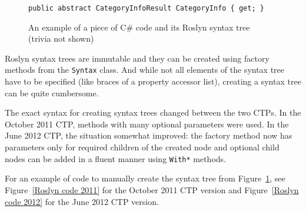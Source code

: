 \begin{figure}[htbp]

\begin{lstlisting}
public abstract CategoryInfoResult CategoryInfo { get; }
\end{lstlisting}

\begin{center}
\end{center}

\caption{An example of a piece of C\# code and its Roslyn syntax tree \\ (trivia not shown)}
\label{Syntax tree}
\end{figure}

\pagebreak[0]

Roslyn syntax trees are immutable and they can be created using factory methods from the \lstinline{Syntax} class.
And while not all elements of the syntax tree have to be specified (like braces of a property accessor list),
creating a syntax tree can be quite cumbersome.

The exact syntax for creating syntax trees changed between the two CTPs.
In the October 2011 CTP, methods with many optional parameters were used.
In the June 2012 CTP, the situation somewhat improved:
the factory method now has parameters only for required children of the created node
and optional child nodes can be added in a fluent manner using \lstinline{With*} methods.

For an example of code to manually create the syntax tree from Figure~\ref{Syntax tree},
see Figure~\ref{Roslyn code 2011} for the October 2011 CTP version and
Figure~\ref{Roslyn code 2012} for the June 2012 CTP version.

